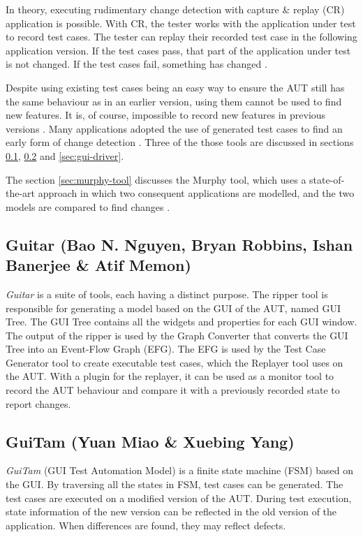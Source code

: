 In theory, executing rudimentary change detection with capture \& replay (CR) application is possible. With CR, the tester works with the application under test to record test cases. The tester can replay their recorded test case in the following application version. If the test cases pass, that part of the application under test is not changed. If the test cases fail, something has changed \cite{VosAho2021}.

Despite using existing test cases being an easy way to ensure the AUT still has the same behaviour as in an earlier version, using them cannot be used to find new features. It is, of course, impossible to record new features in previous versions \cite{VosAho2021}. Many applications adopted the use of generated test cases to find an early form of change detection \cite{aho2019automated}. Three of the those tools are discussed in sections \ref{sec:guitar}, \ref{sec:guitam} and \ref{sec:gui-driver}.

The section \ref{sec:murphy-tool} discusses the Murphy tool, which uses a state-of-the-art approach in which two consequent applications are modelled, and the two models are compared to find changes \cite{aho2019automated}.

\subsection{Guitar (Bao N. Nguyen, Bryan Robbins, Ishan Banerjee \& Atif Memon)} \label{sec:guitar}

\emph{Guitar} \cite{nguyen2014guitar} is a suite of tools, each having a distinct purpose. The ripper tool is responsible for generating a model based on the GUI of the AUT, named GUI Tree. The GUI Tree contains all the widgets and properties for each GUI window. The output of the ripper is used by the Graph Converter that converts the GUI Tree into an Event-Flow Graph (EFG). The EFG is used by the Test Case Generator tool to create executable test cases, which the Replayer tool uses on the AUT. With a plugin for the replayer, it can be used as a monitor tool to record the AUT behaviour and compare it with a previously recorded state to report changes.

\subsection{GuiTam (Yuan Miao \& Xuebing Yang)} \label{sec:guitam}
\emph{GuiTam} \cite{miao2010fsm} (GUI Test Automation Model) is a finite state machine (FSM) based on the GUI. By traversing all the states in FSM, test cases can be generated. The test cases are executed on a modified version of the AUT. During test execution, state information of the new version can be reflected in the old version of the application. When differences are found, they may reflect defects. 


